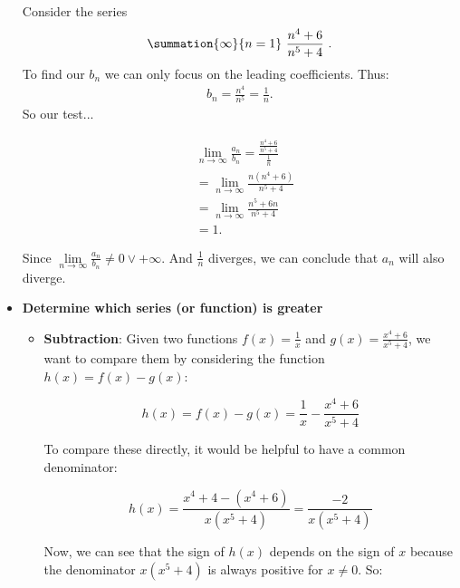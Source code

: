 \documentclass{report}
\begin{document}
\begin{itemize}
        \bigbreak \noindent 
        Consider the series 
        \begin{align*}
            \summation{\infty}{n=1}\ \frac{n^{4} + 6}{n^{5} + 4}\ 
        .\end{align*}
        To find our $b_{n}$ we can only focus on the leading coefficients. Thus: 
        \begin{align*}
            b_{n} = \frac{n^{4}}{n^{5}} = \frac{1}{n}
        .\end{align*}
        So our test...
        \smallbreak \noindent
        \begin{minipage}[t]{0.47\textwidth}
            \begin{align*}
        &\lim\limits_{n \to \infty}{\frac{a_{n}}{b_{n}}} = \frac{\frac{n^{4} + 6}{n^{5} + 4}}{\frac{1}{n}} \\
        &=\lim\limits_{n \to \infty}{\frac{n(n^{4}+6)}{n^{5} + 4}} \\
        &=\lim\limits_{n \to \infty}{\frac{n^{5}+6n}{n^{5} + 4}} \\
        &=1
    .\end{align*}
\end{minipage}
\begin{minipage}[t]{0.47\textwidth}
    Since $\lim\limits_{n \to \infty}{\frac{a_{n}}{b_{n}}} \ne 0 \lor +\infty$. And $\frac{1}{n}$ diverges, we can conclude that $a_{n}$ will also diverge.
\end{minipage}

\item \textbf{Determine which series (or function) is greater}

    \begin{itemize}
        \item \textbf{Subtraction}: Given two functions $f(x) = \frac{1}{x}$ and $g(x) = \frac{x^4 + 6}{x^5 + 4}$, we want to compare them by considering the function $h(x) = f(x) - g(x)$:

            \[
                h(x) = f(x) - g(x) = \frac{1}{x} - \frac{x^4 + 6}{x^5 + 4}
            \]

            To compare these directly, it would be helpful to have a common denominator:

            \[
                h(x) = \frac{x^4 + 4 - (x^4 + 6)}{x(x^5 + 4)} = \frac{-2}{x(x^5 + 4)}
            \]

            Now, we can see that the sign of $h(x)$ depends on the sign of $x$ because the denominator $x(x^5 + 4)$ is always positive for $x \neq 0$. So:


\end{itemize}
\end{itemize}
\end{document}
